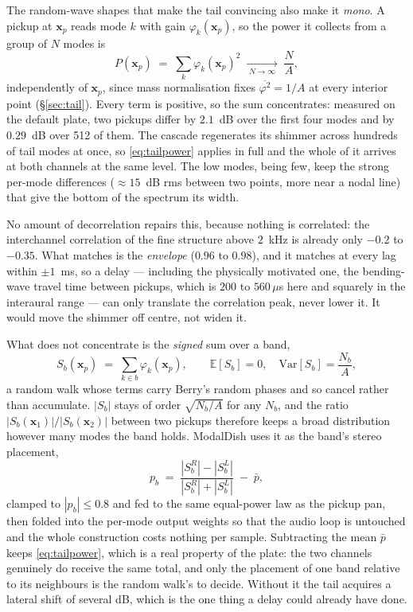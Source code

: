 \documentclass[11pt,a4paper]{article}
\begin{document}
The random-wave shapes that make the tail convincing also make it
\emph{mono}. A pickup at $\bm{x}_p$ reads mode $k$ with gain
$\varphi_k(\bm{x}_p)$, so the power it collects from a group of $N$
modes is
%
\begin{equation}
  P(\bm{x}_p) \;=\; \sum_{k} \varphi_k(\bm{x}_p)^2
  \;\xrightarrow[\;N \to \infty\;]{}\; \frac{N}{A},
  \label{eq:tailpower}
\end{equation}
%
independently of $\bm{x}_p$, since mass normalisation fixes
$\overline{\varphi^2} = 1/A$ at every interior point
(\S\ref{sec:tail}). Every term is positive, so the sum concentrates:
measured on the default plate, two pickups differ by $2.1$~dB over the
first four modes and by $0.29$~dB over 512 of them. The cascade regenerates
its shimmer across hundreds of tail modes at once, so
\eqref{eq:tailpower} applies in full and the whole of it arrives at
both channels at the same level. The low modes, being few, keep the
strong per-mode differences ($\approx 15$~dB rms between two points,
more near a nodal line) that give the bottom of the spectrum its width.

No amount of decorrelation repairs this, because nothing is correlated:
the interchannel correlation of the fine structure above $2$~kHz is
already only $-0.2$ to $-0.35$. What matches is the \emph{envelope}
($0.96$ to $0.98$), and it matches at every lag within $\pm 1$~ms, so a
delay --- including the physically motivated one, the bending-wave
travel time between pickups, which is $200$ to $560\,\mu$s here and
squarely in the interaural range --- can only translate the correlation
peak, never lower it. It would move the shimmer off centre, not widen
it.

What does not concentrate is the \emph{signed} sum over a band,
%
\begin{equation}
  S_b(\bm{x}_p) \;=\; \sum_{k \in b} \varphi_k(\bm{x}_p),
  \qquad
  \mathbb{E}[S_b] = 0, \quad \mathrm{Var}[S_b] = \frac{N_b}{A},
  \label{eq:signedsum}
\end{equation}
%
a random walk whose terms carry Berry's random phases and so cancel
rather than accumulate. $|S_b|$ stays of order $\sqrt{N_b/A}$ for any
$N_b$, and the ratio $|S_b(\bm{x}_1)|/|S_b(\bm{x}_2)|$ between two
pickups therefore keeps a broad distribution however many modes the band
holds. ModalDish uses it as the band's stereo placement,
%
\begin{equation}
  p_b \;=\; \frac{|S_b^R| - |S_b^L|}{|S_b^R| + |S_b^L|} \;-\; \bar{p},
  \label{eq:tailpan}
\end{equation}
%
clamped to $|p_b| \le 0.8$ and fed to the same equal-power law as the
pickup pan, then folded into the per-mode output weights so that the
audio loop is untouched and the whole construction costs nothing per
sample. Subtracting the mean $\bar{p}$ keeps \eqref{eq:tailpower},
which is a real property of the plate: the two channels genuinely do
receive the same total, and only the placement of one band relative to
its neighbours is the random walk's to decide. Without it the tail
acquires a lateral shift of several dB, which is the one thing a delay
could already have done.
\end{document}
